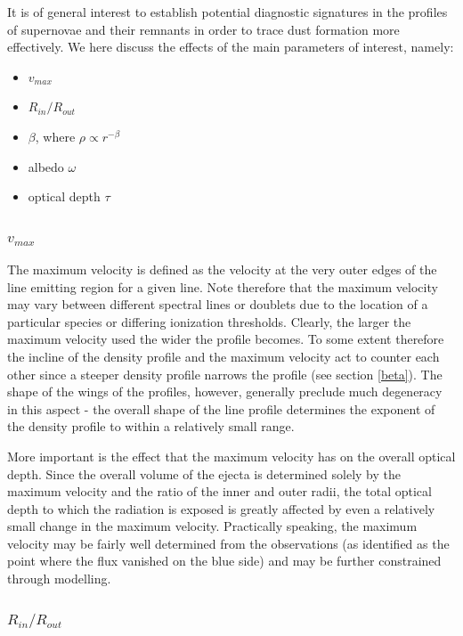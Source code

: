\documentclass[useAMS,usenatbib,usegraphicx]{mnras}
\begin{document}
It is of general interest to establish potential diagnostic signatures in 
the profiles of supernovae and their remnants in order to trace dust 
formation more effectively.  We here discuss the effects of the main 
parameters of interest, namely:

\begin{itemize}
\item $v_{max}$
\item $R_{in}/R_{out}$
\item $\beta$, where $\rho \propto r^{-\beta}$
\item albedo $\omega$ 
\item optical depth  $\tau$
\end{itemize}


\subsubsection{$v_{max}$}

The maximum velocity is defined as the velocity at the very outer edges of 
the line emitting region for a given line.  Note therefore that the 
maximum velocity may vary between different spectral lines or doublets due 
to the location of a particular species or differing ionization 
thresholds.  Clearly, the larger the maximum velocity used the wider the 
profile becomes.  To some extent therefore the incline of the density 
profile and the maximum velocity act to counter each other since a steeper 
density profile narrows the profile (see section \ref{beta}).  The shape 
of the wings of the profiles, however, generally preclude much degeneracy 
in this aspect - the overall shape of the line profile determines the 
exponent of the density profile to within a relatively small range.

More important is the effect that the maximum velocity has on the overall 
optical depth.  Since the overall volume of the ejecta is determined 
solely by the maximum velocity and the ratio of the inner and outer radii, 
the total optical depth to which the radiation is exposed is greatly 
affected by even a relatively small change in the maximum velocity.  
Practically speaking, the maximum velocity may be fairly well determined 
from the observations (as identified as the point where the flux vanished 
on the blue side) and may be further constrained through modelling.

\subsubsection{$R_{in}/R_{out}$}
\end{document}
